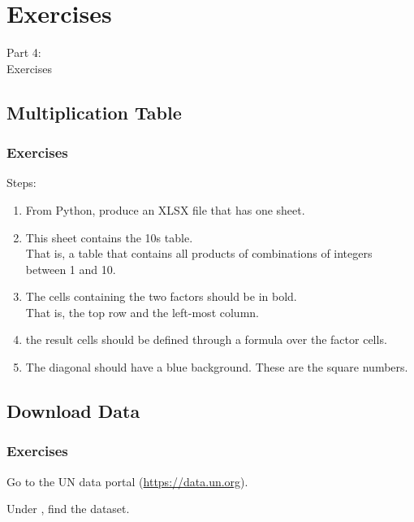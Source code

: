 {
\renewcommand{\bgcolor}{ex}

\section{Exercises}
\begin{frame}
  \vspace{25mm}
  \begin{center}
    \Huge{Part 4:\\Exercises}
  \end{center}
\end{frame}

\subsection{Multiplication Table}
\begin{frame}[fragile]
  \frametitle{Exercises }
  \vspace{3mm}
  Steps:
  \begin{enumerate}
    \item From Python, produce an XLSX file that has one sheet.
    \item This sheet contains the 10s table. \\
          That is, a table that contains all products of combinations of integers between 1 and 10.
    \item The cells containing the two factors should be in bold. \\
          That is, the top row and the left-most column.
    \item the result cells should be defined through a formula over the factor cells.
    \item The diagonal should have a blue background. These are the square numbers.
  \end{enumerate}
\end{frame}

\subsection{Download Data}
\begin{frame}[fragile]
  \frametitle{Exercises }
  \vspace{3mm}
  Go to the UN data portal (\url{https://data.un.org}).
  
  \vspace{5mm}
  Under \textsl{}, find the \textsl{} dataset.
  

\end{frame}}
